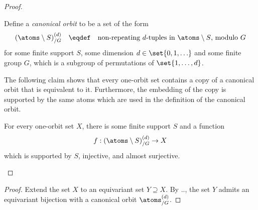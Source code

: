 \begin{proof}
            \begin{definition}
            Define a \emph{canonical orbit} to be a set of the form 
            \begin{align*}
            (\atoms \setminus S)^{(d)}_{/G} \quad \eqdef \quad  \text{non-repeating $d$-tuples in $\atoms \setminus S$, modulo $G$}
            \end{align*}
            for some finite support $S$, some dimension $d \in \set{0,1,\ldots}$ and some finite group $G$, which is a subgroup of permutations of $\set{1,\ldots,d}$. 
        \end{definition}

    The following claim shows that every one-orbit set contains a copy of a canonical orbit that is equivalent to it. Furthermore, the embedding of the copy is supported by the same atoms which are used in the definition of the canonical orbit.

    \begin{claim}
        For every one-orbit set $X$, there is some finite support $S$ and a function 
        \begin{align*}
        f : (\atoms \setminus S)^{(d)}_{/G} \to X
        \end{align*}
        which is supported by $S$, injective, and almost surjective.
    \end{claim}
\end{proof}
\begin{proof}
    Extend the set $X$ to an equivariant set $Y \supseteq X$. By .., the set $Y$ admits an equivariant bijection with a canonical orbit $\atoms^{(d)}_{/G}$.
\end{proof}


